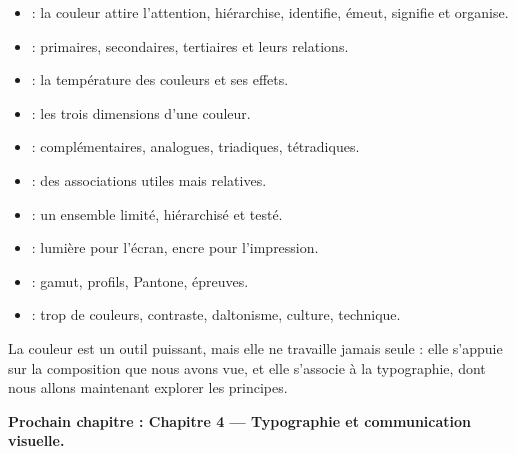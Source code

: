 \begin{itemize}
    \item {} : la couleur attire l'attention, hiérarchise, identifie, émeut, signifie et organise.
    \item {} : primaires, secondaires, tertiaires et leurs relations.
    \item {} : la température des couleurs et ses effets.
    \item {} : les trois dimensions d'une couleur.
    \item {} : complémentaires, analogues, triadiques, tétradiques.
    \item {} : des associations utiles mais relatives.
    \item {} : un ensemble limité, hiérarchisé et testé.
    \item {} : lumière pour l'écran, encre pour l'impression.
    \item {} : gamut, profils, Pantone, épreuves.
    \item {} : trop de couleurs, contraste, daltonisme, culture, technique.
\end{itemize}

La couleur est un outil puissant, mais elle ne travaille jamais seule : elle s'appuie sur la composition que nous avons vue, et elle s'associe à la typographie, dont nous allons maintenant explorer les principes.

\vspace{1em}

\begin{center}
\textbf{Prochain chapitre : Chapitre 4 --- Typographie et communication visuelle.}
\end{center}
